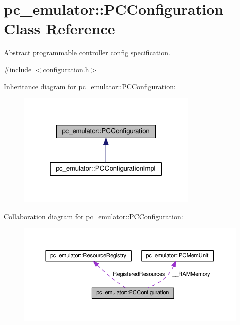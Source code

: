 \hypertarget{classpc__emulator_1_1PCConfiguration}{}\section{pc\+\_\+emulator\+:\+:P\+C\+Configuration Class Reference}
\label{classpc__emulator_1_1PCConfiguration}


Abstract programmable controller config specification.  




{\ttfamily \#include $<$configuration.\+h$>$}



Inheritance diagram for pc\+\_\+emulator\+:\+:P\+C\+Configuration\+:
\nopagebreak
\begin{figure}[H]
\begin{center}
\leavevmode
\includegraphics[width=247pt]{classpc__emulator_1_1PCConfiguration__inherit__graph}
\end{center}
\end{figure}


Collaboration diagram for pc\+\_\+emulator\+:\+:P\+C\+Configuration\+:
\nopagebreak
\begin{figure}[H]
\begin{center}
\leavevmode
\includegraphics[width=350pt]{classpc__emulator_1_1PCConfiguration__coll__graph}
\end{center}
\end{figure}
